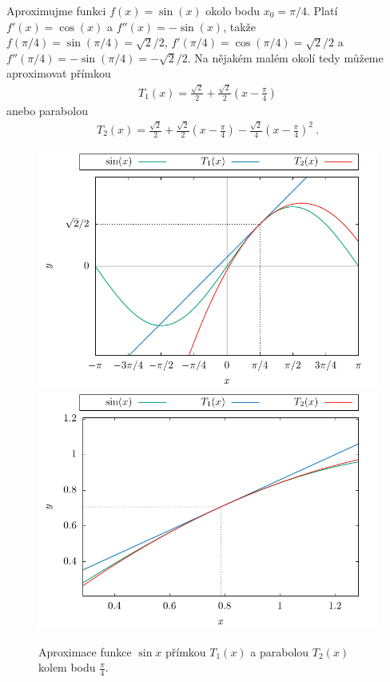 \begin{example}
    Aproximujme funkci $f(x) = \sin(x)$ okolo bodu $x_0 = \pi/4$. Platí $f'(x) = \cos (x)$ a $f''(x) = - \sin (x)$, takže $f(\pi/4) = \sin (\pi/4) = \sqrt{2}/2$, $f'(\pi/4) = \cos (\pi/4) = \sqrt{2}/2$ a $f''(\pi/4) = - \sin (\pi/4) = -\sqrt{2}/2$.
    Na nějakém malém okolí tedy můžeme aproximovat přímkou \begin{align}
        T_1(x) = \frac{\sqrt{2}}{2} + \frac{\sqrt{2}}{2} \left(x - \frac{\pi}{4} \right)
    \end{align} 
    anebo parabolou
    \begin{align}
        T_2(x) = \frac{\sqrt{2}}{2} + \frac{\sqrt{2}}{2} \left( x - \frac{\pi}{4} \right) 
        - \frac{\sqrt{2}}{4} \left( x - \frac{\pi}{4} \right)^2  \:.
    \end{align}

    \begin{figure}[H]
        \centering

        \includegraphics[scale = 0.7]{Gnuplot/Figures/aproximace-sinus.pdf}
        \includegraphics[scale = 0.7]{Gnuplot/Figures/aproximace-sinus2.pdf}

        \caption{Aproximace funkce $\sin x$ přímkou $T_1(x)$ a parabolou $T_2(x)$ kolem bodu $\frac{\pi}{4}$.}
    \end{figure}

\end{example}

